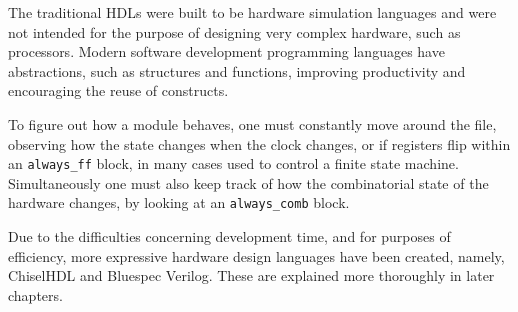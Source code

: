 \documentclass[a4paper,8pt]{report}
\begin{document}
The traditional HDLs were built to be hardware simulation languages and were not
intended for the purpose of designing very complex hardware, such as processors.
Modern software development programming languages have abstractions, such as
structures and functions, improving productivity and encouraging the reuse of
constructs.

To figure out how a module behaves, one must constantly move around the file,
observing how the state changes when the clock changes, or if registers flip
within an \texttt{always\_ff} block, in many cases used to control a finite state
machine. Simultaneously one must also keep track of how the combinatorial state
of the hardware changes, by looking at an \texttt{always\_comb} block.

Due to the difficulties concerning development time, and for purposes of
efficiency, more expressive hardware design languages have been created, namely,
ChiselHDL and Bluespec Verilog. These are explained more thoroughly in later chapters.





\end{document}
